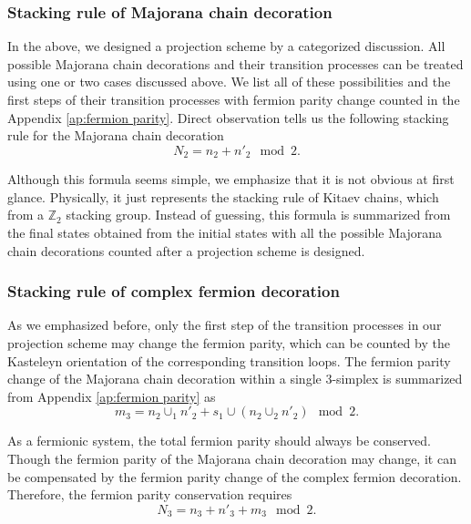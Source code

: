 \documentclass[%
 reprint,
 amsmath,amssymb,
 aps,
prb,
]{revtex4-2}
\begin{document}
\subsubsection{Stacking rule of Majorana chain decoration}

In the above, we designed a projection scheme by a categorized discussion.
All possible Majorana chain decorations and their transition processes can be treated using one or two cases discussed above.
We list all of these possibilities and the first steps of their transition processes with fermion parity change counted in the Appendix \ref{ap:fermion parity}.
Direct observation tells us the following stacking rule for the Majorana chain decoration 
\begin{equation}
N_2 = n_2 + n'_2 \mod 2 . \label{eq:n2 stacking}
\end{equation}

Although this formula seems simple, we emphasize that it is not obvious at first glance.
Physically, it just represents the stacking rule of Kitaev chains, which from a $\mathbb Z_2$ stacking group.
Instead of guessing, this formula is summarized from the final states obtained from the initial states with all the possible Majorana chain decorations counted after a projection scheme is designed.

\subsubsection{Stacking rule of complex fermion decoration}

As we emphasized before, only the first step of the transition processes in our projection scheme may change the fermion parity, which can be counted by the Kasteleyn orientation of the corresponding transition loops.
The fermion parity change of the Majorana chain decoration within a single 3-simplex is summarized from Appendix \ref{ap:fermion parity} as 
\begin{equation}
m_3 = n_2 \cup_1 n'_2 + s_1 \cup (n_2 \cup_2 n'_2) \mod 2 .
\end{equation}

As a fermionic system, the total fermion parity should always be conserved.
Though the fermion parity of the Majorana chain decoration may change, it can be compensated by the fermion parity change of the complex fermion decoration.
Therefore, the fermion parity conservation requires 
\begin{equation}
N_3 = n_3 + n'_3 + m_3 \mod 2 . \label{eq:n3 stacking}
\end{equation}
\end{document}
